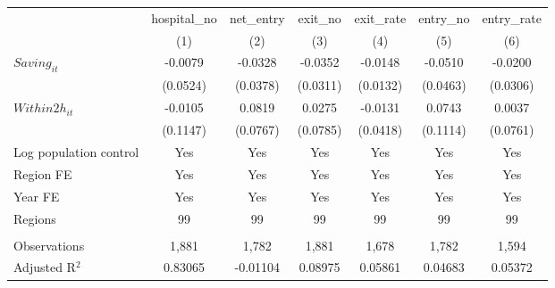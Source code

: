 \begingroup
\centering
\begin{tabular}{lcccccc}
   \toprule
                          & hospital\_no  & net\_entry  & exit\_no  & exit\_rate  & entry\_no  & entry\_rate \\    
                          & (1)           & (2)         & (3)       & (4)         & (5)        & (6)\\  
   \midrule 
   $Saving_{it}$          & -0.0079       & -0.0328     & -0.0352   & -0.0148     & -0.0510    & -0.0200\\   
                          & (0.0524)      & (0.0378)    & (0.0311)  & (0.0132)    & (0.0463)   & (0.0306)\\   
   $Within2h_{it}$        & -0.0105       & 0.0819      & 0.0275    & -0.0131     & 0.0743     & 0.0037\\   
                          & (0.1147)      & (0.0767)    & (0.0785)  & (0.0418)    & (0.1114)   & (0.0761)\\   
   Log population control & Yes           & Yes         & Yes       & Yes         & Yes        & Yes\\  
   Region FE              & Yes           & Yes         & Yes       & Yes         & Yes        & Yes\\  
   Year FE                & Yes           & Yes         & Yes       & Yes         & Yes        & Yes\\  
   Regions                & 99            & 99          & 99        & 99          & 99         & 99\\  
    \\
   Observations           & 1,881         & 1,782       & 1,881     & 1,678       & 1,782      & 1,594\\  
   Adjusted R$^2$         & 0.83065       & -0.01104    & 0.08975   & 0.05861     & 0.04683    & 0.05372\\  
   \bottomrule
\end{tabular}
\par\endgroup
